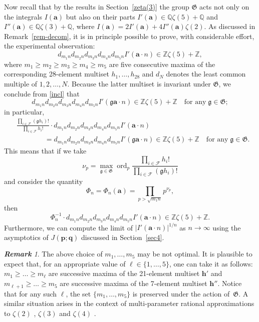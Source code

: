 \documentclass[12pt,reqno]{amsart}
\theoremstyle{remark}
\newtheorem{remark}{\bf Remark}
\newcommand{\ord}{\operatorname{ord}}
\newcommand\ba{\boldsymbol a}
\newcommand\bh{\boldsymbol h}
\newcommand\bp{\boldsymbol p}
\newcommand\bq{\boldsymbol q}
\newcommand\cF{\mathcal F}
\newcommand\frG{\mathfrak G}
\newcommand\frg{\mathfrak g}
\newcommand{\francisnote}[1]{{\color{red} Francis: #1}}
\newcommand{\wadimnote}[1]{{\color{blue} Wadim: #1}}
\begin{document}
Now recall that by the results in Section~\ref{zeta(3)} the group $\frG$ acts not only on the integrals $I(\ba)$ but also on their parts $I'(\ba)\in\mathbb Q\zeta(5)+\mathbb Q$ and $I''(\ba)\in\mathbb Q\zeta(3)+\mathbb Q$, where
$I(\ba)=2I'(\ba)+4I''(\ba)\zeta(2)$.
As discussed in Remark~\ref{rem-decom},  it is in principle possible to prove, with considerable effort, the experimental observation:
\begin{equation}
d_{m_1n}d_{m_2n}d_{m_3n}d_{m_4n}d_{m_5n}I'(\ba\cdot n)\in\mathbb Z\zeta(5)+\mathbb Z,
\label{incl}
\end{equation}
where $m_1\ge m_2\ge m_3\ge m_4\ge m_5$ are five consecutive maxima of the corresponding 28-element multiset $h_1,\dots,h_{28}$ and $d_N$ denotes the least common multiple of $1,2,\dots,N$.
Because the latter multiset is invariant under $\frG$, we conclude from \eqref{incl} that
\begin{equation*}
d_{m_1n}d_{m_2n}d_{m_3n}d_{m_4n}d_{m_5n}I'(\frg\ba\cdot n)\in\mathbb Z\zeta(5)+\mathbb Z
\quad\text{for any}\; \frg\in\frG;
\end{equation*}
in particular,
\begin{align*}
&
\frac{\prod_{i\in\cF}(\frg h_i)!}{\prod_{i\in\cF}h_i!}
\cdot d_{m_1n}d_{m_2n}d_{m_3n}d_{m_4n}d_{m_5n}I'(\ba\cdot n)
\\ &\qquad\qquad
=d_{m_1n}d_{m_2n}d_{m_3n}d_{m_4n}d_{m_5n}I'(\frg\ba\cdot n)\in\mathbb Z\zeta(5)+\mathbb Z
\quad\text{for any}\; \frg\in\frG.
\end{align*}
This means that if we take
\begin{equation}
\nu_p=\max_{\frg\in\frG}\ord_p\frac{\prod_{i\in\cF}h_i!}{\prod_{i\in\cF}(\frg h_i)!}
\label{nu_p}
\end{equation}
and consider the quantity
\[
\Phi_n=\Phi_n(\ba)=\prod_{p>\sqrt{m_1n}}p^{\nu_p},
\]
then
\begin{equation}
\Phi_n^{-1}\cdot d_{m_1n}d_{m_2n}d_{m_3n}d_{m_4n}d_{m_5n}I'(\ba\cdot n)
\in\mathbb Z\zeta(5)+\mathbb Z.
\label{sharp_incl}
\end{equation}
Furthermore, we can compute the limit of $|I'(\ba\cdot n)|^{1/n}$ as $n\to\infty$ using the asymptotics of $J(\bp;\bq)$ discussed in Section~\ref{sec4}.

\begin{remark}
\label{m_i}
The above choice of $m_1,\dots,m_5$ may be not optimal. It is plausible to expect that, for an appropriate value of  $\ell\in\{1,\dots,5\}$, one can take it as follows: $m_1\ge\dots\ge m_\ell$ are successive maxima of the 21-element multiset $\bh'$ and $m_{\ell+1}\ge\dots\ge m_5$ are successive maxima of the 7-element multiset $\bh''$.
Notice that  for any such $\ell$, the set  $\{m_1,\dots,m_5\}$ is  preserved under the action of~$\frG$. A similar situation arises in the context of  multi-parameter rational approximations to $\zeta(2)$ \cite{RV96,Zu14}, $\zeta(3)$ \cite{RV01} and $\zeta(4)$ \cite{MZ20}.
\end{remark}
\end{document}
